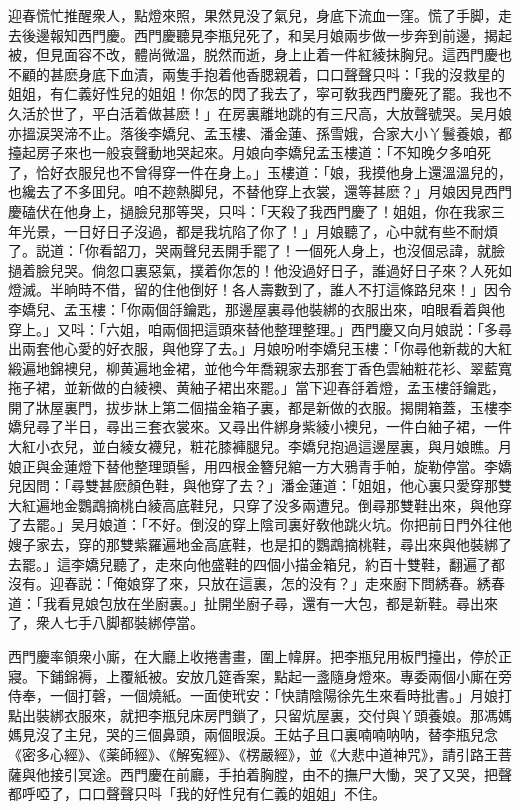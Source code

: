 迎春慌忙推醒衆人，點燈來照，果然見没了氣兒，身底下流血一窪。慌了手脚，走去後邊報知西門慶。西門慶聽見李瓶兒死了，和吴月娘兩步做一步奔到前邊，揭起被，但見面容不改，體尚微溫，脱然而逝，身上止着一件紅綾抹胸兒。這西門慶也不顧的甚麽身底下血漬，兩隻手抱着他香腮親着，口口聲聲只呌：「我的沒救星的姐姐，有仁義好性兒的姐姐！你怎的閃了我去了，寜可敎我西門慶死了罷。我也不久活於世了，平白活着做甚麽！」在房裏離地跳的有三尺高，大放聲號哭。吴月娘亦搵涙哭渧不止。落後李嬌兒、孟玉樓、潘金蓮、孫雪娥，合家大小丫鬟養娘，都擡起房子來也一般哀聲動地哭起來。月娘向李嬌兒孟玉樓道：「不知晚夕多咱死了，恰好衣服兒也不曾得穿一件在身上。」玉樓道：「娘，我摸他身上還溫溫兒的，也纔去了不多囬兒。咱不趂熱脚兒，不替他穿上衣裳，還等甚麽？」月娘因見西門慶磕伏在他身上，撾臉兒那等哭，只呌：「天殺了我西門慶了！姐姐，你在我家三年光景，一日好日子沒過，都是我坑陷了你了！」月娘聽了，心中就有些不耐煩了。説道：「你看韶刀，哭兩聲兒丟開手罷了！一個死人身上，也沒個忌諱，就臉撾着臉兒哭。倘忽口裏惡氣，撲着你怎的！他没過好日子，誰過好日子來？人死如燈滅。半晌時不借，留的住他倒好！各人壽數到了，誰人不打這條路兒來！」因令李嬌兒、孟玉樓：「你兩個㧱鑰匙，那邊屋裏尋他裝綁的衣服出來，咱眼看着與他穿上。」又呌：「六姐，咱兩個把這頭來替他整理整理。」西門慶又向月娘説：「多尋出兩套他心愛的好衣服，與他穿了去。」月娘吩咐李嬌兒玉樓：「你尋他新裁的大紅緞遍地錦襖兒，柳黄遍地金裙，並他今年喬親家去那套丁香色雲紬粧花衫、翠藍寬拖子裙，並新做的白綾襖、黄紬子裙出來罷。」當下迎春㧱着燈，孟玉樓㧱鑰匙，開了牀屋裏門，拔步牀上第二個描金箱子裏，都是新做的衣服。揭開箱蓋，玉樓李嬌兒尋了半日，尋出三套衣裳來。又尋出件綁身紫綾小襖兒，一件白紬子裙，一件大紅小衣兒，並白綾女襪兒，粧花膝褲腿兒。李嬌兒抱過這邊屋裏，與月娘瞧。月娘正與金蓮燈下替他整理頭髻，用四根金簪兒綰一方大鴉青手帕，旋勒停當。李嬌兒因問：「尋雙甚麽顏色鞋，與他穿了去？」潘金蓮道：「姐姐，他心裏只愛穿那雙大紅遍地金鸚鵡摘桃白綾高底鞋兒，只穿了没多兩遭兒。倒尋那雙鞋出來，與他穿了去罷。」吴月娘道：「不好。倒沒的穿上陰司裏好敎他跳火坑。你把前日門外往他嫂子家去，穿的那雙紫羅遍地金高底鞋，也是扣的鸚鵡摘桃鞋，尋出來與他裝綁了去罷。」這李嬌兒聽了，走來向他盛鞋的四個小描金箱兒，約百十雙鞋，翻遍了都沒有。迎春説：「俺娘穿了來，只放在這裏，怎的没有？」走來廚下問綉春。綉春道：「我看見娘包放在坐廚裏。」扯開坐廚子尋，還有一大包，都是新鞋。尋出來了，衆人七手八脚都裝綁停當。

西門慶率領衆小廝，在大廳上收捲書畫，圍上幃屏。把李瓶兒用板門擡出，停於正寢。下鋪錦褥，上覆紙被。安放几筵香案，點起一盞隨身燈來。專委兩個小廝在旁侍奉，一個打磬，一個燒紙。一面使玳安：「快請陰陽徐先生來看時批書。」月娘打點出裝綁衣服來，就把李瓶兒床房門鎖了，只留炕屋裏，交付與丫頭養娘。那馮媽媽見沒了主兒，哭的三個鼻頭，兩個眼淚。王姑子且口裏喃喃呐呐，替李瓶兒念《密多心經》、《薬師經》、《解寃經》、《楞嚴經》，並《大悲中道神咒》，請引路王菩薩與他接引冥途。西門慶在前廳，手拍着胸膛，由不的撫尸大慟，哭了又哭，把聲都呼啞了，口口聲聲只呌「我的好性兒有仁義的姐姐」不住。

